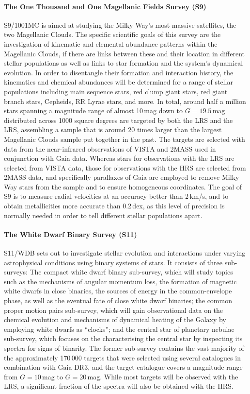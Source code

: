 \documentclass[a4paper,11pt]{article}
\begin{document}
\paragraph{The One Thousand and One Magellanic Fields Survey (S9)}
S9/1001MC \citep{4mosts9} is aimed at studying the Milky Way's most massive satellites, the two Magellanic Clouds. The specific scientific goals of this survey are the investigation of kinematic and elemental abundance patterns within the Magellanic Clouds, if there are links between these and their location in different stellar populations as well as links to star formation and the system's dynamical evolution. In order to disentangle their formation and interaction history, the kinematics and chemical abundances will be determined for a range of stellar populations including main sequence stars, red clump giant stars, red giant branch stars, Cepheids, RR Lyrae stars, and more. In total, around half a million stars spanning a magnitude range of almost 10\,mag down to $G=19.5$\,mag distributed across 1000 square degrees are targeted by both the LRS and the LRS, assembling a sample that is around 20 times larger than the largest Magellanic Clouds sample put together in the past. The targets are selected with data from the near-infrared observations of VISTA and 2MASS used in conjunction with Gaia data. Whereas stars for observations with the LRS are selected from VISTA data, those for observations with the HRS are selected from 2MASS data, and specifically parallaxes of Gaia are employed to remove Milky Way stars from the sample and to ensure homogeneous coordinates. The goal of S9 is to measure radial velocities at an accuracy better than 2\,km/s, and to obtain metallicities more accurate than 0.2\,dex, as this level of precision is normally needed in order to tell different stellar populations apart.
%
\paragraph{The White Dwarf Binary Survey (S11)}
S11/WDB \citep{4mosts11} sets out to investigate stellar evolution and interactions under varying astrophysical conditions using binary systems of stars. It consists of three sub-surveys: The compact white dwarf binary sub-survey, which will study topics such as the mechanisms of angular momentum loss, the formation of magnetic white dwarfs in close binaries, the sources of energy in the common-envelope phase, as well as the eventual fate of close white dwarf binaries; the common proper motion pairs sub-survey, which will gain observational data on the chemical evolution and mechanisms of dynamical heating of the Galaxy by employing white dwarfs as ``clocks''; and the central star of planetary nebulae sub-survey, which focuses on the characterising the central star by inspecting its spectra for signs of binarity. The former sub-survey contains the vast majority of the approximately 170\,000 targets that were selected using several catalogues in combination with Gaia DR3, and the target catalogue covers a magnitude range from $G=10$\,mag to $G=20$\,mag. While most targets will be observed with the LRS, a significant fraction of the spectra will also be obtained with the HRS.
%
\end{document}
